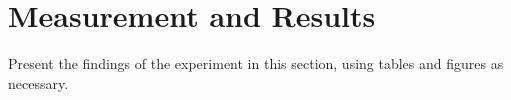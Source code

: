 \section{Measurement and Results}
Present the findings of the experiment in this section, using tables and figures as necessary.
